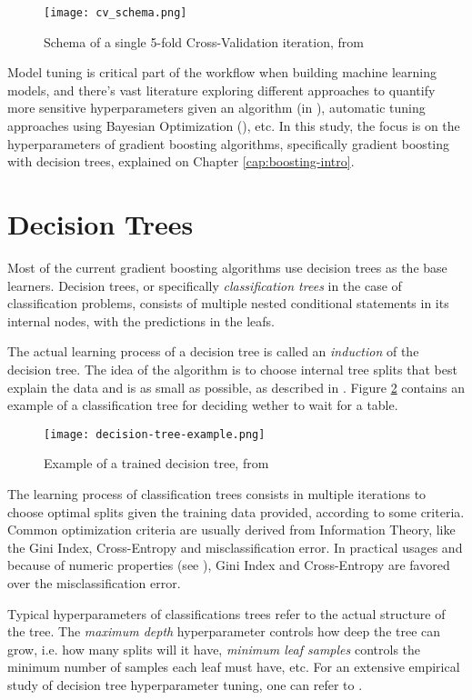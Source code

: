 \begin{figure}[!h]
    \centering
    \texttt{[image: cv\_schema.png]} 
    \caption{Schema of a single 5-fold Cross-Validation iteration, from \cite{hastie2009elements}}
    \label{fig:cvschema}
\end{figure}

Model tuning is critical part of the workflow when building machine learning models, and there's vast literature exploring different approaches to quantify more sensitive hyperparameters given an algorithm (in \cite{probst2018tunability}), automatic tuning approaches using Bayesian Optimization (\cite{bergstra2013hyperopt}), etc. In this study, the focus is on the hyperparameters of gradient boosting algorithms, specifically gradient boosting with decision trees, explained on Chapter \ref{cap:boosting-intro}.

\section{Decision Trees}

Most of the current gradient boosting algorithms use decision trees as the base learners. Decision trees, or specifically \textit{classification trees} in the case of classification problems, consists of multiple nested conditional statements in its internal nodes, with the predictions in the leafs.

The actual learning process of a decision tree is called an \textit{induction} of the decision tree. The idea of the algorithm is to choose internal tree splits that best explain the data and is as small as possible, as described in \cite{aima:2010}. Figure \ref{fig:decision-tree-example} contains an example of a classification tree for deciding wether to wait for a table.

\begin{figure}[!h]
    \centering
    \texttt{[image: decision-tree-example.png]} 
    \caption{Example of a trained decision tree, from \cite{aima:2010}}
    \label{fig:decision-tree-example}
\end{figure}

The learning process of classification trees consists in multiple iterations to choose optimal splits given the training data provided, according to some criteria. Common optimization criteria are usually derived from Information Theory, like the Gini Index, Cross-Entropy and misclassification error. In practical usages and because of numeric properties (see \cite{hastie2009elements}), Gini Index and Cross-Entropy are favored over the misclassification error.

Typical hyperparameters of classifications trees refer to the actual structure of the tree. The \textit{maximum depth} hyperparameter controls how deep the tree can grow, i.e. how many splits will it have, \textit{minimum leaf samples} controls the minimum number of samples each leaf must have, etc. For an extensive empirical study of decision tree hyperparameter tuning, one can refer to \cite{mantovani2018empirical}.
